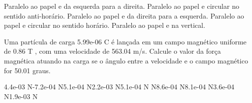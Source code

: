 \documentclass[12pt, addpoints]{exam}
\begin{document}
\begin{questions}
\begin{multicols*}{2}
\begin{choices}
\choice Paralelo ao papel e da esquerda para a direita. 
\choice Paralelo ao papel e circular no sentido anti-horário. 
\choice Paralelo ao papel e da direita para a esquerda. 
\choice Paralelo ao papel e circular no sentido horário. 
\choice Paralelo ao papel e na vertical. 
\end{choices}
\question Uma partícula de carga 5.99e-06 C é lançada em um campo magnético uniforme de    0.86 T , com uma velocidade de 563.04 m/s. Calcule o valor da força magnética atuando na carga se o ângulo entre a velocidade e o campo magnético for   50.01 graus.

\begin{oneparchoices}
\choice 4.4e-03 N\choice -7.2e-04 N\choice 5.1e-04 N\choice 2.2e-03 N\choice 5.1e-04 N N\choice 8.6e-04 N\choice 8.1e-04 N\choice 3.6e-04 N\choice 1.9e-03 N
\end{oneparchoices}\end{multicols*}
\end{questions}
\newpage
\end{document}

